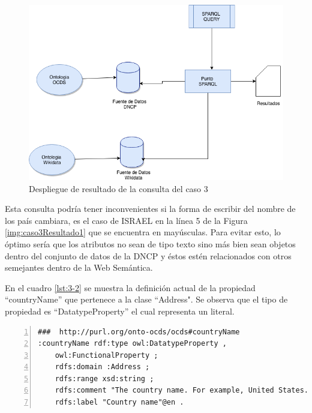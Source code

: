  \begin{figure}[ht!]
    \centering
    \includegraphics[width=150mm]{figuras/Diagramas-Caso3.png}
    \caption{Despliegue de resultado de la consulta del caso 3}
    \label{img:DiagramaCaso3}
 \end{figure}

 Esta consulta podría tener inconvenientes si la forma de escribir del nombre de los país cambiara, es el caso de ISRAEL en la línea 5 de la Figura \ref{img:caso3Resultado1} que se encuentra en mayúsculas. Para evitar esto, lo óptimo sería que los atributos no sean de tipo texto sino más bien sean objetos dentro del conjunto de datos de la DNCP y éstos estén relacionados con otros semejantes dentro de la Web Semántica.

En el cuadro \ref{lst:3-2} se muestra la definición actual de la propiedad “countryName” que pertenece a la clase “Address". Se observa que el tipo de propiedad es “DatatypeProperty” el cual representa un literal.\hfill \break 

\noindent\begin{minipage}[c]{\textwidth}
\begin{lstlisting}[captionpos=b, caption=Definicion de la propiedad countryName, label={lst:3-2},  numbers=left,  numberstyle=\tiny\color{mygray},
    basicstyle=\footnotesize\ttfamily,frame=single]
###  http://purl.org/onto-ocds/ocds#countryName
:countryName rdf:type owl:DatatypeProperty ,
    owl:FunctionalProperty ;
    rdfs:domain :Address ;
    rdfs:range xsd:string ;
    rdfs:comment "The country name. For example, United States."@en ;
    rdfs:label "Country name"@en .
 \end{lstlisting}
\end{minipage}

